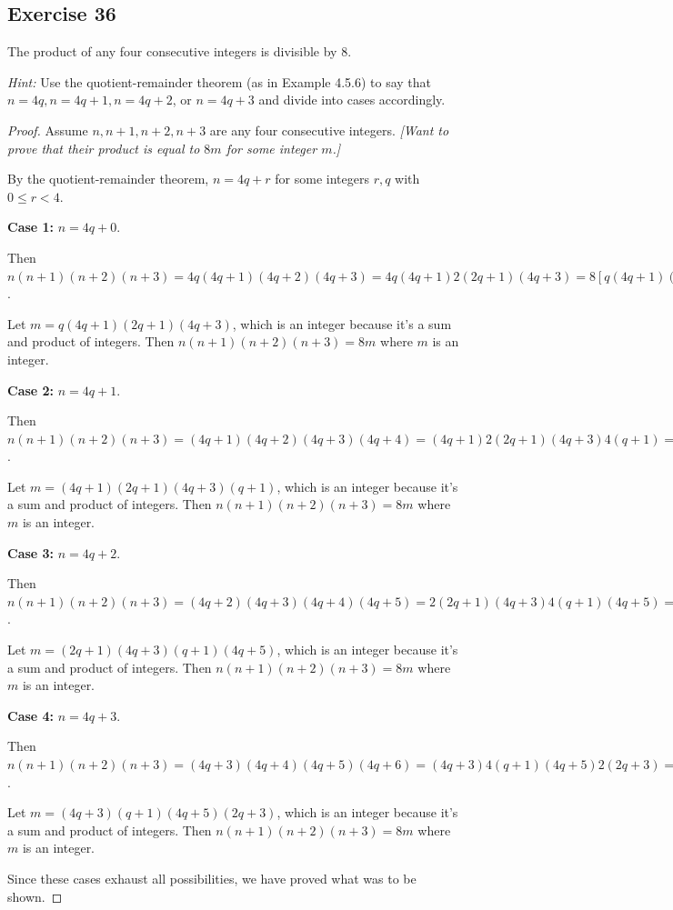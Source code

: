 \documentclass[14pt]{extarticle}
\begin{document}
\subsection{Exercise 36}
The product of any four consecutive integers is divisible by 8.

{\it Hint:} Use the quotient-remainder theorem (as in Example 4.5.6) to say that $n = 4q, n = 4q + 1, n = 4q + 2$, or $n = 4q + 3$ and divide into cases accordingly.

\begin{proof}
Assume $n, n+1, n+2, n+3$ are any four consecutive integers. {\it [Want to prove that their product is equal to $8m$ for some integer $m$.]}

By the quotient-remainder theorem, $n = 4q+r$ for some integers $r,q$ with $0 \leq r < 4$.

{\bf Case 1:} $n = 4q + 0$.

Then $n(n+1)(n+2)(n+3) = 4q(4q+1)(4q+2)(4q+3) = 4q(4q+1)2(2q+1)(4q+3) = 8[q(4q+1)(2q+1)(4q+3)]$.

Let $m = q(4q+1)(2q+1)(4q+3)$, which is an integer because it's a sum and product of integers. Then $n(n+1)(n+2)(n+3) = 8m$ where $m$ is an integer.

{\bf Case 2:} $n = 4q + 1$.

Then $n(n+1)(n+2)(n+3) = (4q+1)(4q+2)(4q+3)(4q+4) = (4q+1)2(2q+1)(4q+3)4(q+1) = 8[(4q+1)(2q+1)(4q+3)(q+1)]$.

Let $m = (4q+1)(2q+1)(4q+3)(q+1)$, which is an integer because it's a sum and product of integers. Then $n(n+1)(n+2)(n+3) = 8m$ where $m$ is an integer.

{\bf Case 3:} $n = 4q + 2$.

Then $n(n+1)(n+2)(n+3) = (4q+2)(4q+3)(4q+4)(4q+5) = 2(2q+1)(4q+3)4(q+1)(4q+5) = 8[(2q+1)(4q+3)(q+1)(4q+5)]$.

Let $m = (2q+1)(4q+3)(q+1)(4q+5)$, which is an integer because it's a sum and product of integers. Then $n(n+1)(n+2)(n+3) = 8m$ where $m$ is an integer.

{\bf Case 4:} $n = 4q + 3$.

Then $n(n+1)(n+2)(n+3) = (4q+3)(4q+4)(4q+5)(4q+6) = (4q+3)4(q+1)(4q+5)2(2q+3) = 8[(4q+3)(q+1)(4q+5)(2q+3)]$.

Let $m = (4q+3)(q+1)(4q+5)(2q+3)$, which is an integer because it's a sum and product of integers. Then $n(n+1)(n+2)(n+3) = 8m$ where $m$ is an integer.

Since these cases exhaust all possibilities, we have proved what was to be shown.
\end{proof}
\end{document}
